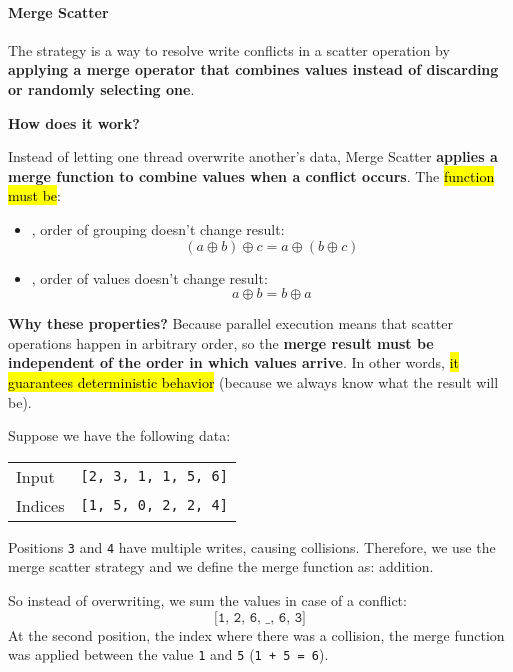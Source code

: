 \paragraph{Merge Scatter}

The  strategy is a way to resolve write conflicts in a scatter operation by \textbf{applying a merge operator that combines values instead of discarding or randomly selecting one}.  

\highspace
\begin{flushleft}
    \textcolor{Green3}{ \textbf{How does it work?}}
\end{flushleft}
Instead of letting one thread overwrite another's data, Merge Scatter \textbf{applies a merge function to combine values when a conflict occurs}. The \hl{function must be}:
\begin{itemize}
    \item {}, order of grouping doesn't change result:
    \begin{equation*}
        \left(a \oplus b\right) \oplus c = a \oplus \left(b \oplus c\right)
    \end{equation*}
    \item {}, order of values doesn't change result:
    \begin{equation*}
        a \oplus b = b \oplus a
    \end{equation*}
\end{itemize}
\textcolor{Green3}{ \textbf{Why these properties?}} Because parallel execution means that scatter operations happen in arbitrary order, so the \textbf{merge result must be independent of the order in which values arrive}. In other words, \hl{it guarantees deterministic behavior} (because we always know what the result will be).

\highspace
\begin{examplebox}
    Suppose we have the following data:
    \begin{center}
        \begin{tabular}{@{} l | l @{}}
            \toprule
            Input   & \texttt{[2, 3, 1, 1, 5, 6]} \\
            Indices & \texttt{[1, 5, 0, 2, 2, 4]} \\
            \bottomrule
        \end{tabular}
    \end{center}
    Positions \texttt{3} and \texttt{4} have multiple writes, causing collisions. Therefore, we use the merge scatter strategy and we define the merge function as: addition.

    \highspace
    So instead of overwriting, we sum the values in case of a conflict:
    \begin{equation*}
        \texttt{[1, 2, 6, \_, 6, 3]}
    \end{equation*}
    At the second position, the index where there was a collision, the merge function was applied between the value \texttt{1} and \texttt{5} (\texttt{1 + 5 = 6}).
\end{examplebox}

